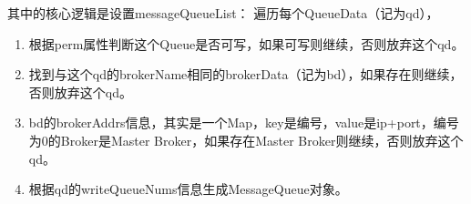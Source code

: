 其中的核心逻辑是设置messageQueueList：
遍历每个QueueData（记为qd），

\begin{enumerate}[itemindent=1em]
\item 根据perm属性判断这个Queue是否可写，如果可写则继续，否则放弃这个qd。
\item 找到与这个qd的brokerName相同的brokerData（记为bd），如果存在则继续，否则放弃这个qd。
\item bd的brokerAddrs信息，其实是一个Map，key是编号，value是ip+port，编号为0的Broker是Master Broker，如果存在Master Broker则继续，否则放弃这个qd。
\item 根据qd的writeQueueNums信息生成MessageQueue对象。
\end{enumerate}
